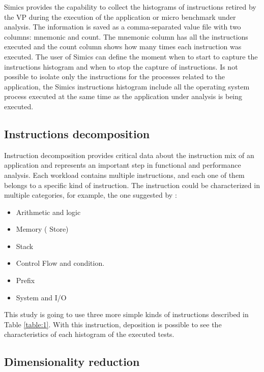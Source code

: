 \documentclass[]{PhDEngScITESO-R}
\begin{document}
Simics provides the capability to collect the histograms of instructions retired by the VP during the execution of the application or micro benchmark under analysis. The information is saved as a comma-separated value file with two columns: mnemonic and count. The mnemonic column has all the instructions executed and the count column shows how many times each instruction was executed. The user of Simics can define the moment when to start to capture the instructions histogram and when to stop the capture of instructions. Is not possible to isolate only the instructions for the processes related to the application, the Simics instructions histogram include all the operating system process executed at the same time as the application under analysis is being executed.

\subsection{Instructions decomposition}
\label{subsec: Instructions decomposition }

 Instruction decomposition provides critical data about the instruction mix of an application and represents an important step in functional and performance analysis. Each workload contains multiple instructions, and each one of them belongs to a specific kind of instruction. The instruction could be characterized in multiple categories, for example, the one suggested by \cite{Daniel}:

 \begin{itemize}
 \item Arithmetic and logic
 \item Memory ( Store)
 \item Stack
 \item Control Flow and condition.
 \item Prefix
 \item System and I/O
\end{itemize}

This study is going to use three more simple kinds of instructions described in Table \ref{table:1}. With this instruction, deposition is possible to see the characteristics of each histogram of the executed tests.

\subsection{ Dimensionality reduction }
\label{subsec:  Dimensionality reduction  }
\end{document}
